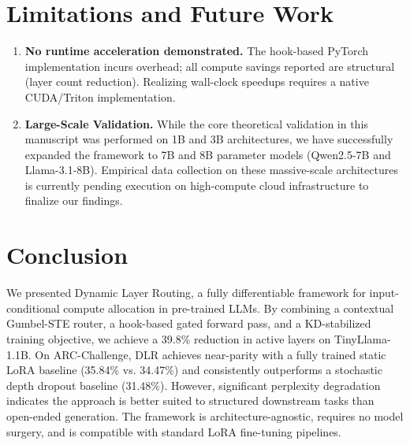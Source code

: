 \documentclass[conference]{IEEEtran}
\begin{document}
\section{Limitations and Future Work}
\begin{enumerate}
    \item \textbf{No runtime acceleration demonstrated.} The hook-based PyTorch implementation incurs overhead; all compute savings reported are structural (layer count reduction). Realizing wall-clock speedups requires a native CUDA/Triton implementation.
    \item \textbf{Large-Scale Validation.} While the core theoretical validation in this manuscript was performed on 1B and 3B architectures, we have successfully expanded the framework to 7B and 8B parameter models (Qwen2.5-7B and Llama-3.1-8B). Empirical data collection on these massive-scale architectures is currently pending execution on high-compute cloud infrastructure to finalize our findings.
\end{enumerate}

\section{Conclusion}
We presented Dynamic Layer Routing, a fully differentiable framework for input-conditional compute allocation in pre-trained LLMs. By combining a contextual Gumbel-STE router, a hook-based gated forward pass, and a KD-stabilized training objective, we achieve a 39.8\% reduction in active layers on TinyLlama-1.1B. On ARC-Challenge, DLR achieves near-parity with a fully trained static LoRA baseline (35.84\% vs. 34.47\%) and consistently outperforms a stochastic depth dropout baseline (31.48\%). However, significant perplexity degradation indicates the approach is better suited to structured downstream tasks than open-ended generation. The framework is architecture-agnostic, requires no model surgery, and is compatible with standard LoRA fine-tuning pipelines.
\end{document}
